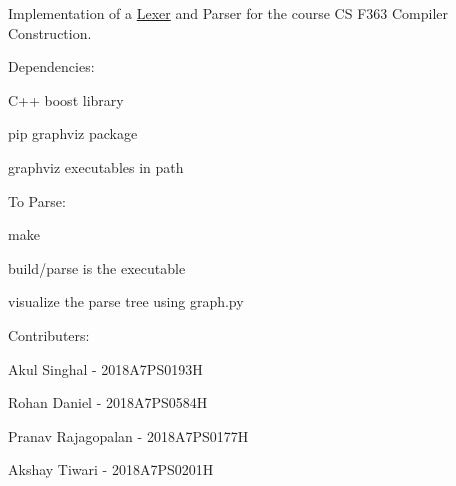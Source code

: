 \label{index_md_Readme}%
%
 Implementation of a \mbox{\hyperlink{class_lexer}{Lexer}} and Parser for the course CS F363 Compiler Construction.

Dependencies\+:


\begin{DoxyItemize}
\item C++ boost library
\item pip graphviz package
\item graphviz executables in path
\end{DoxyItemize}

To Parse\+:


\begin{DoxyItemize}
\item make
\item build/parse is the executable
\item visualize the parse tree using graph.\+py
\end{DoxyItemize}

Contributers\+:


\begin{DoxyItemize}
\item Akul Singhal -\/ 2018A7\+PS0193H
\item Rohan Daniel -\/ 2018A7\+PS0584H
\item Pranav Rajagopalan -\/ 2018A7\+PS0177H
\item Akshay Tiwari -\/ 2018A7\+PS0201H 
\end{DoxyItemize}